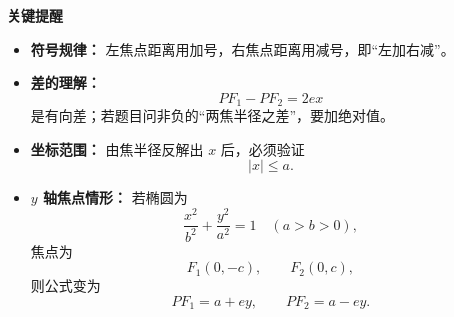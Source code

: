 \begin{summarybox}
	\medskip
	\textbf{\textcolor{CSummary}{关键提醒}}
	\begin{itemize}[leftmargin=*, itemsep=0.5em, topsep=0.4em]
		\item \textbf{符号规律：} 左焦点距离用加号，右焦点距离用减号，即“左加右减”。
		\item \textbf{差的理解：}
		      \[
			      PF_1-PF_2=2ex
		      \]
		      是有向差；若题目问非负的“两焦半径之差”，要加绝对值。
		\item \textbf{坐标范围：} 由焦半径反解出 $x$ 后，必须验证
		      \[
			      |x|\le a.
		      \]
		\item \textbf{$y$ 轴焦点情形：} 若椭圆为
		      \[
			      \frac{x^2}{b^2}+\frac{y^2}{a^2}=1\quad (a>b>0),
		      \]
		      焦点为
		      \[
			      F_1(0,-c),\qquad F_2(0,c),
		      \]
		      则公式变为
		      \[
			      PF_1=a+ey,\qquad PF_2=a-ey.
		      \]
	\end{itemize}
\end{summarybox}